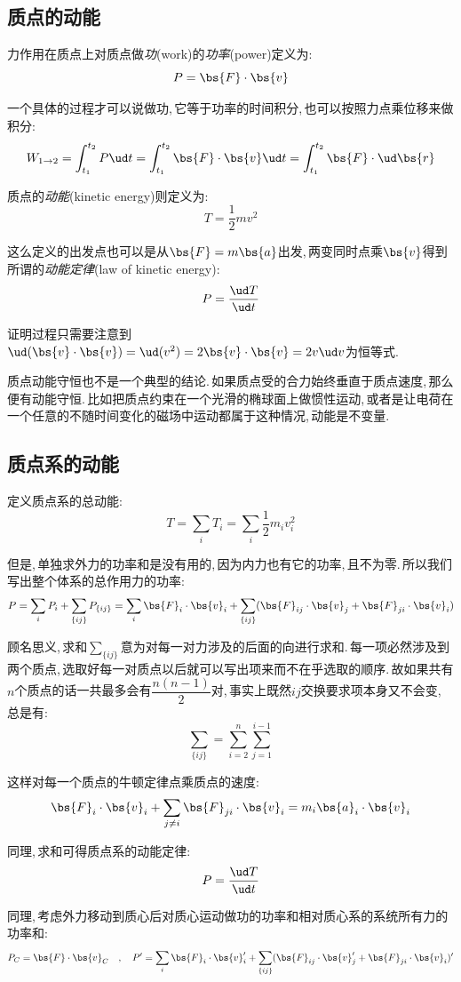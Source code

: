 \subsection{质点的动能}
力作用在质点上对质点做\emph{功}(work)的\emph{功率}(power)定义为:
\[P=\bs{F}\cdot\bs{v}\]

一个具体的过程才可以说做功,\,它等于功率的时间积分,\,也可以按照力点乘位移来做积分:
\[W_{1\rightarrow 2}=\int_{t_1}^{t_2}P\ud t=\int_{t_1}^{t_2}\bs{F}\cdot\bs{v}\ud t=\int_{t_1}^{t_2}\bs{F}\cdot\ud \bs{r}\]

质点的\emph{动能}(kinetic energy)则定义为:
\[T=\frac{1}{2}mv^2\]

这么定义的出发点也可以是从$\bs{F}=m\bs{a}$出发,\,两变同时点乘$\bs{v}$得到所谓的\emph{动能定律}(law of kinetic energy):
\[P=\frac{\ud T}{\ud t}\]

证明过程只需要注意到$\ud(\bs{v}\cdot\bs{v})=\ud(v^2)=2\bs{v}\cdot \bs{v}=2v\ud v$为恒等式.

质点动能守恒也不是一个典型的结论.\,如果质点受的合力始终垂直于质点速度,\,那么便有动能守恒.\,比如把质点约束在一个光滑的椭球面上做惯性运动,\,或者是让电荷在一个任意的不随时间变化的磁场中运动都属于这种情况,\,动能是不变量.

\subsection{质点系的动能}
定义质点系的总动能:
\[T=\sum_iT_i=\sum_i \frac{1}{2}m_i v_i^2\]

但是,\,单独求外力的功率和是没有用的,\,因为内力也有它的功率,\,且不为零.\,所以我们写出整个体系的总作用力的功率:
\[P=\sum_i P_i+\sum_{\{ij\}}P_{\{ij\}}=\sum_i \bs{F}_i\cdot \bs{v}_i+\sum_{\{ij\}}(\bs{F}_{ij}\cdot \bs{v}_j+\bs{F}_{ji}\cdot \bs{v}_i)\]

顾名思义,\,求和$\displaystyle\sum_{\{ij\}}$意为对每一对力涉及的后面的向进行求和.\,每一项必然涉及到两个质点,\,选取好每一对质点以后就可以写出项来而不在乎选取的顺序.\,故如果共有$n$个质点的话一共最多会有$\dfrac{n(n-1)}{2}$对,\,事实上既然$ij$交换要求项本身又不会变,\,总是有:
\[\sum_{\{ij\}}=\sum_{i=2}^n\sum_{j=1}^{i-1}\]

这样对每一个质点的牛顿定律点乘质点的速度:
\[\bs{F}_i\cdot \bs{v}_i+\sum_{j\neq i}\bs{F}_{ji}\cdot \bs{v}_i=m_i\bs{a}_i\cdot\bs{v}_i\]

同理,\,求和可得质点系的动能定律:
\[P=\frac{\ud T}{\ud t}\]

同理,\,考虑外力移动到质心后对质心运动做功的功率和相对质心系的系统所有力的功率和:
\[P_C=\bs{F}\cdot\bs{v}_C\quad,\quad P'=\sum_i \bs{F}_i\cdot \bs{v}_i'+\sum_{\{ij\}}(\bs{F}_{ij}\cdot \bs{v}_j'+\bs{F}_{ji}\cdot \bs{v}_i)'\]

